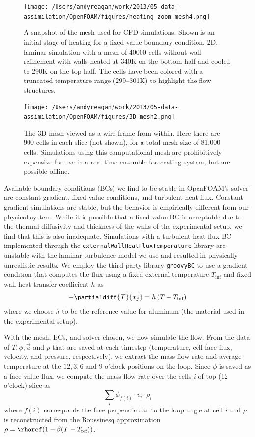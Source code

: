\begin{figure}[h]
  \centering
  \texttt{[image: /Users/andyreagan/work/2013/05-data-assimilation/OpenFOAM/figures/heating\_zoom\_mesh4.png]}
  \caption[A snapshot of the mesh used for CFD simulations]{
    A snapshot of the mesh used for CFD simulations.
    Shown is an initial stage of heating for a fixed value boundary condition, 2D, laminar simulation with a mesh of 40000 cells without wall refinement with walls heated at 340K on the bottom half and cooled to 290K on the top half.
    The cells have been colored with a truncated temperature range (299--301K) to highlight the flow structures.
  }
  \label{fig:CFDmesh1}
\end{figure}

\begin{figure}[h]
  \centering
  \texttt{[image: /Users/andyreagan/work/2013/05-data-assimilation/OpenFOAM/figures/3D-mesh2.png]}
  \caption[The 3D mesh viewed as a wire-frame from within]{
    The 3D mesh viewed as a wire-frame from within.
    Here there are 900 cells in each slice (not shown), for a total mesh size of 81,000 cells.
    Simulations using this computational mesh are prohibitively expensive for use in a real time ensemble forecasting system, but are possible offline.
  }
  \label{fig:CFDmesh2}
\end{figure}

Available boundary conditions (BCs) we find to be stable in OpenFOAM's solver are constant gradient, fixed value conditions, and turbulent heat flux.
Constant gradient simulations are stable, but the behavior is empirically different from our physical system.
While it is possible that a fixed value BC is acceptable due to the thermal diffusivity and thickness of the walls of the experimental setup, we find that this is also inadequate.
Simulations with a turbulent heat flux BC implemented through the \verb|externalWallHeatFluxTemperature| library are unstable with the laminar turbulence model we use and resulted in physically unrealistic results.
We employ the third-party library \verb|groovyBC| to use a gradient condition that computes the flux using a fixed external temperature $T_\text{inf}$ and fixed wall heat transfer coefficient $h$ as $$ - \partialdiff{T}{x_j} = h \left( T-T_\text{inf} \right)$$ where we choose $h$ to be the reference value for aluminum (the material used in the experimental setup).

With the mesh, BCs, and solver chosen, we now simulate the flow.
From the data of $T,\phi,\vec{u}$ and $p$ that are saved at each timestep (temperature, cell face flux, velocity, and pressure, respectively), we extract the mass flow rate and average temperature at the $12,3,6$ and $9$ o'clock positions on the loop.
Since $\phi$ is saved as a face-value flux, we compute the mass flow rate over the cells $i$ of top (12 o'clock) slice as
\begin{equation} \sum _i\phi_{f(i)} \cdot v_i \cdot \rho_i\end{equation}
where $f(i)$ corresponds the face perpendicular to the loop angle at cell $i$ and $\rho$ is reconstructed from the Boussinesq approximation $\rho = \rhoref (1-\beta(T-T_\text{ref}))$.

